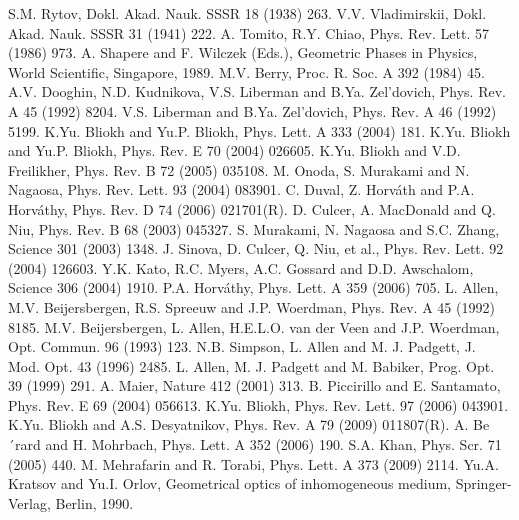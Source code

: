 \documentclass[aps,pra,preprint,superscriptaddress,showpacs,showkeys]{revtex4}
\begin{document}
\begin{thebibliography}{widest-label}
 S.M. Rytov, Dokl. Akad. Nauk. SSSR 18 (1938) 263. 
 V.V. Vladimirskii, Dokl. Akad. Nauk. SSSR 31 (1941) 222.
 A. Tomito, R.Y. Chiao, Phys. Rev. Lett. 57 (1986) 973.
 A. Shapere and F. Wilczek (Eds.), Geometric Phases in Physics, World Scientific, Singapore, 1989.
 M.V. Berry, Proc. R. Soc. A 392 (1984) 45. 
 A.V. Dooghin, N.D. Kudnikova, V.S. Liberman and B.Ya. Zel'dovich, Phys. Rev. A 45 (1992) 8204.
 V.S. Liberman and B.Ya. Zel'dovich, Phys. Rev. A 46 (1992) 5199.
 K.Yu. Bliokh and Yu.P. Bliokh, Phys. Lett. A 333 (2004) 181.
 K.Yu. Bliokh and Yu.P. Bliokh, Phys. Rev. E 70 (2004) 026605.
 K.Yu. Bliokh and V.D. Freilikher, Phys. Rev. B 72 (2005) 035108.
 M. Onoda, S. Murakami and N. Nagaosa, Phys. Rev. Lett. 93 (2004) 083901.
 C. Duval, Z. Horv\'{a}th and P.A. Horv\'{a}thy, Phys. Rev. D 74 (2006) 021701(R).
 D. Culcer, A. MacDonald and Q. Niu, Phys. Rev. B 68 (2003) 045327.
 S. Murakami, N. Nagaosa and S.C. Zhang, Science 301 (2003) 1348.
 J. Sinova, D. Culcer, Q. Niu, et al., Phys. Rev. Lett. 92 (2004) 126603.
 Y.K. Kato, R.C. Myers, A.C. Gossard and D.D. Awschalom, Science 306 (2004) 1910.
 P.A. Horv\'{a}thy, Phys. Lett. A 359 (2006) 705.
 L. Allen, M.V. Beijersbergen, R.S. Spreeuw and J.P. Woerdman, Phys. Rev. A 45 (1992) 8185.
 M.V. Beijersbergen, L. Allen, H.E.L.O. van der Veen and J.P. Woerdman, Opt. Commun. 96 (1993) 123.
 N.B. Simpson, L. Allen and M. J. Padgett, J. Mod. Opt. 43 (1996) 2485.
 L. Allen, M. J. Padgett and M. Babiker, Prog. Opt. 39 (1999) 291.
 A. Maier, Nature 412 (2001) 313.
 B. Piccirillo and E. Santamato, Phys. Rev. E 69 (2004) 056613.
K.Yu. Bliokh, Phys. Rev. Lett. 97 (2006) 043901.
K.Yu. Bliokh and A.S. Desyatnikov, Phys. Rev. A 79 (2009) 011807(R).
 A. Be´rard and H. Mohrbach, Phys. Lett. A 352 (2006) 190.
 S.A. Khan, Phys. Scr. 71 (2005) 440.
 M. Mehrafarin and R. Torabi, Phys. Lett. A 373 (2009) 2114.
 Yu.A. Kratsov and Yu.I. Orlov,  Geometrical optics of inhomogeneous medium, Springer-Verlag, Berlin, 1990.
\end{thebibliography}
\end{document}
